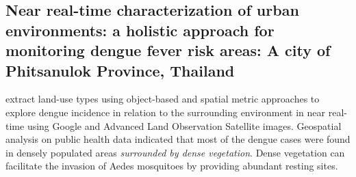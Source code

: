 \documentclass[review]{elsarticle}
\begin{document}

\subsection{Near real-time characterization of urban environments: a holistic approach for monitoring dengue fever risk areas: A city of Phitsanulok Province, Thailand}

\cite{sarfraz2014near} extract land-use types using object-based and spatial metric approaches to explore dengue incidence in relation to the surrounding environment in near real-time using Google and Advanced Land Observation Satellite images. Geospatial analysis on public health data indicated that most of the dengue cases were found in densely populated areas \textit{surrounded by dense vegetation}. Dense vegetation can facilitate the invasion of Aedes mosquitoes by providing abundant resting sites. 

%
%
\end{document}
